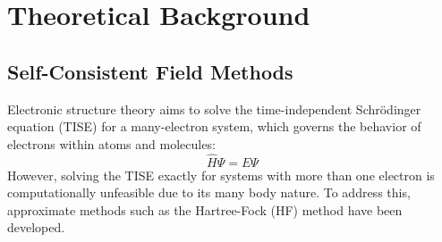 \chapter{Theoretical Background}\label{ch:theory}

\section{Self-Consistent Field Methods} \label{sec:SCF}
Electronic structure theory aims to solve the time-independent Schrödinger equation (TISE) for a many-electron system, which governs the behavior of electrons within atoms and molecules:
\begin{equation}\label{eq:TISE}
    \hat{H} \Psi = E \Psi
\end{equation}
However, solving the TISE exactly for systems with more than one electron is computationally unfeasible due to its many body nature. To address this, approximate methods such as the Hartree-Fock (HF) method have been developed\cite{hartree1928wave,fock1930naherungsmethode}.

